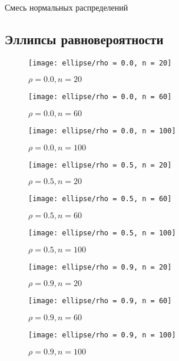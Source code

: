 \documentclass[12pt,a4paper]{article}
\begin{document}
\begin{table}[h!]
	\centering
	
	\caption{Смесь нормальных распределений}
\end{table}
\pagebreak

\subsection{Эллипсы равновероятности}
\begin{figure}[h!]
	\centering
	\texttt{[image: ellipse/rho = 0.0, n = 20]}
	\caption{$\rho = 0.0, n = 20$}
	\label{fig:image1}
\end{figure}
\begin{figure}[h!]
	\centering
	\texttt{[image: ellipse/rho = 0.0, n = 60]}
	\caption{$\rho = 0.0, n = 60$}
	\label{fig:image2}
\end{figure}
\pagebreak

\begin{figure}[h!]
	\centering
	\texttt{[image: ellipse/rho = 0.0, n = 100]}
	\caption{$\rho = 0.0, n = 100$}
	\label{fig:image3}
\end{figure}
\begin{figure}[h!]
	\centering
	\texttt{[image: ellipse/rho = 0.5, n = 20]}
	\caption{$\rho = 0.5, n = 20$}
	\label{fig:image4}
\end{figure}
\pagebreak

\begin{figure}[h!]
	\centering
	\texttt{[image: ellipse/rho = 0.5, n = 60]}
	\caption{$\rho = 0.5, n = 60$}
	\label{fig:image5}
\end{figure}
\begin{figure}[h!]
	\centering
	\texttt{[image: ellipse/rho = 0.5, n = 100]}
	\caption{$\rho = 0.5, n = 100$}
	\label{fig:image6}
\end{figure}
\pagebreak

\begin{figure}[h!]
	\centering
	\texttt{[image: ellipse/rho = 0.9, n = 20]}
	\caption{$\rho = 0.9, n = 20$}
	\label{fig:image7}
\end{figure}
\begin{figure}[h!]
	\centering
	\texttt{[image: ellipse/rho = 0.9, n = 60]}
	\caption{$\rho = 0.9, n = 60$}
	\label{fig:image8}
\end{figure}
\pagebreak

\begin{figure}[h!]
	\centering
	\texttt{[image: ellipse/rho = 0.9, n = 100]}
	\caption{$\rho = 0.9, n = 100$}
	\label{fig:image9}
\end{figure}
\pagebreak
\end{document}
